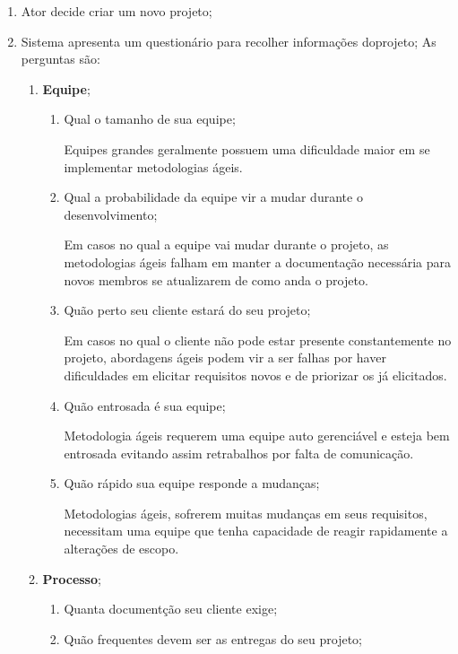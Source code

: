 	\begin{enumerate}
		\item Ator decide criar um novo projeto;
		\item Sistema apresenta um questionário para recolher informações doprojeto;
			As perguntas são:
			\begin{enumerate}
				\item \textbf{Equipe};
					\begin{enumerate}
						\item Qual o tamanho de sua equipe;

							Equipes grandes geralmente possuem uma dificuldade maior em se implementar metodologias ágeis.

						\item Qual a probabilidade da equipe vir a mudar durante o desenvolvimento;

							Em casos no qual a equipe vai mudar durante o projeto, as metodologias ágeis falham em manter a documentação necessária para novos membros se atualizarem de como anda o projeto.

						\item Quão perto seu cliente estará do seu projeto;

							Em casos no qual o cliente não pode estar presente constantemente no projeto, abordagens ágeis podem vir a ser falhas por haver dificuldades em elicitar requisitos novos e de priorizar os já elicitados.

						\item Quão entrosada é sua equipe;

							Metodologia ágeis requerem uma equipe auto gerenciável e esteja bem entrosada evitando assim retrabalhos por falta de comunicação.

						\item Quão rápido sua equipe responde a mudanças;

							Metodologias ágeis, sofrerem muitas mudanças em seus requisitos, necessitam uma equipe que tenha capacidade de reagir rapidamente a alterações de escopo.

					\end{enumerate}
				\item \textbf{Processo};
					\begin{enumerate}
						\item Quanta documentção seu cliente exige;
						\item Quão frequentes devem ser as entregas do seu projeto;


\end{enumerate}
\end{enumerate}
\end{enumerate}
